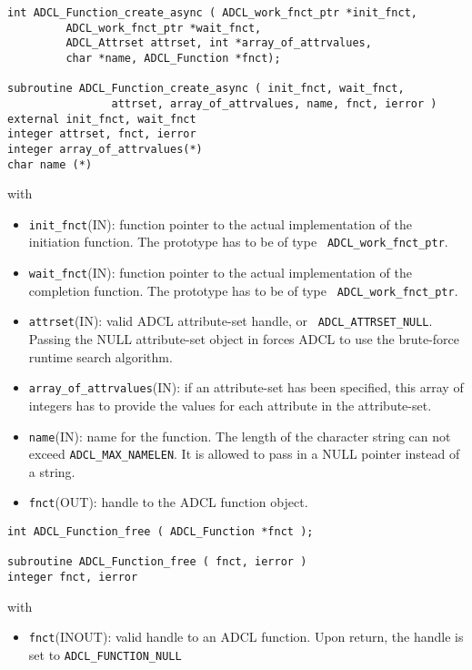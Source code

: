 \hspace{1cm}
\begin{verbatim}
int ADCL_Function_create_async ( ADCL_work_fnct_ptr *init_fnct, 
         ADCL_work_fnct_ptr *wait_fnct, 
         ADCL_Attrset attrset, int *array_of_attrvalues, 
         char *name, ADCL_Function *fnct);

subroutine ADCL_Function_create_async ( init_fnct, wait_fnct, 
                attrset, array_of_attrvalues, name, fnct, ierror )
external init_fnct, wait_fnct
integer attrset, fnct, ierror
integer array_of_attrvalues(*)
char name (*)	  
\end{verbatim}
with
\begin{itemize}

\item {\tt init\_fnct}(IN): function pointer to the actual implementation of
  the initiation function. The prototype has to be of type {\tt
    ADCL\_work\_fnct\_ptr}.

\item {\tt wait\_fnct}(IN): function pointer to the actual implementation of
  the completion function. The prototype has to be of type {\tt
    ADCL\_work\_fnct\_ptr}.

\item {\tt attrset}(IN): valid ADCL attribute-set handle, or {\tt
  ADCL\_ATTRSET\_NULL}. Passing the NULL attribute-set object in forces ADCL
  to use the brute-force runtime search algorithm.

\item {\tt array\_of\_attrvalues}(IN): if an attribute-set has been specified,
  this array of integers has to provide the values for each attribute in the
  attribute-set.

\item {\tt name}(IN): name for the function. The length of the character
  string can not exceed {\tt ADCL\_MAX\_NAMELEN}. It is allowed to pass in a
  NULL pointer instead of a string.

\item {\tt fnct}(OUT): handle to the ADCL function object.
\end{itemize}


\hspace{1cm}
\begin{verbatim}
int ADCL_Function_free ( ADCL_Function *fnct );

subroutine ADCL_Function_free ( fnct, ierror )
integer fnct, ierror
\end{verbatim}
with
\begin{itemize}

\item {\tt fnct}(INOUT): valid handle to an ADCL function. Upon return, the
  handle is set to {\tt ADCL\_FUNCTION\_NULL}
\end{itemize}

